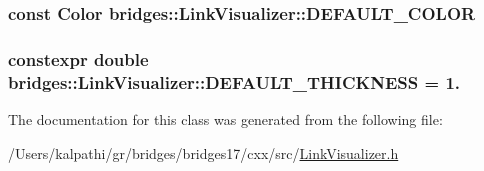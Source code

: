 \subsubsection[{D\+E\+F\+A\+U\+L\+T\+\_\+\+C\+O\+L\+O\+R}]{\setlength{\rightskip}{0pt plus 5cm}const {\bf Color} bridges\+::\+Link\+Visualizer\+::\+D\+E\+F\+A\+U\+L\+T\+\_\+\+C\+O\+L\+O\+R\hspace{0.3cm}{\ttfamily [static]}}\label{classbridges_1_1_link_visualizer_a7698ad5b243041377d81152a339d1282}
\hypertarget{classbridges_1_1_link_visualizer_ab790c33080c769008114db34d5ec8950}{}
\subsubsection[{D\+E\+F\+A\+U\+L\+T\+\_\+\+T\+H\+I\+C\+K\+N\+E\+S\+S}]{\setlength{\rightskip}{0pt plus 5cm}constexpr double bridges\+::\+Link\+Visualizer\+::\+D\+E\+F\+A\+U\+L\+T\+\_\+\+T\+H\+I\+C\+K\+N\+E\+S\+S = 1.\hspace{0.3cm}{\ttfamily [static]}}\label{classbridges_1_1_link_visualizer_ab790c33080c769008114db34d5ec8950}


The documentation for this class was generated from the following file\+:\begin{DoxyCompactItemize}
\item 
/\+Users/kalpathi/gr/bridges/bridges17/cxx/src/\hyperlink{_link_visualizer_8h}{Link\+Visualizer.\+h}\end{DoxyCompactItemize}
